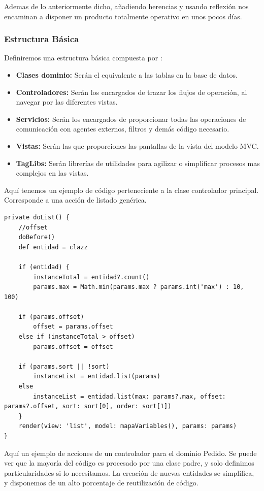 Ademas de lo anteriormente dicho, añadiendo herencias y usando reflexión nos encaminan a disponer un producto totalmente operativo en unos pocos días.

\subsubsection{Estructura Básica}

Definiremos una estructura básica compuesta por :
\begin{itemize}	
	\item \textbf{Clases dominio: } Serán el equivalente a las tablas en la base de datos. 
	\item \textbf{Controladores: } Serán los encargados de trazar los flujos de operación, al navegar por las diferentes vistas. 
	\item \textbf{Servicios: } Serán los encargados de proporcionar todas las operaciones de comunicación con agentes externos, filtros y demás código necesario. 
	\item \textbf{Vistas: } Serán las que proporciones las pantallas de la vista del modelo MVC. 
	\item \textbf{TagLibs: } Serán librerías de utilidades para agilizar o simplificar procesos mas complejos en las vistas. 
\end{itemize}

Aquí tenemos un ejemplo de código perteneciente a la clase controlador principal. Corresponde a una acción de listado genérica.
\pagebreak

\begin{lstlisting}[style=JAVA]
private doList() {
	//offset
	doBefore()
	def entidad = clazz
	
	if (entidad) {
		instanceTotal = entidad?.count()
		params.max = Math.min(params.max ? params.int('max') : 10, 100)

	if (params.offset) 
		offset = params.offset
	else if (instanceTotal > offset) 
		params.offset = offset
	
	if (params.sort || !sort)
		instanceList = entidad.list(params)
	else
		instanceList = entidad.list(max: params?.max, offset: params?.offset, sort: sort[0], order: sort[1])
	}
	render(view: 'list', model: mapaVariables(), params: params)
}

\end{lstlisting}

Aquí un ejemplo de acciones de un controlador para el dominio Pedido. Se puede ver que la mayoría del código es procesado por una clase padre, y solo definimos particularidades si lo necesitamos. La creación de nuevas entidades se simplifica, y disponemos de un alto porcentaje de reutilización de código.

